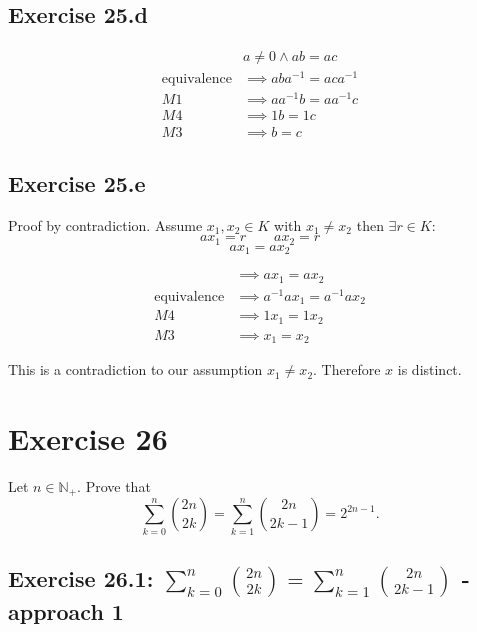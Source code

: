 \documentclass[a4paper]{article}
\theoremstyle{definition}
\begin{document}
\subsection{Exercise 25.d}

\begin{align*}
                     & a \neq 0 \land ab = ac \\
  \text{equivalence} &\implies aba^{-1} = aca^{-1} \\
                  M1 &\implies aa^{-1}b = aa^{-1}c \\
                  M4 &\implies 1b = 1c \\
                  M3 &\implies b = c
\end{align*}

\subsection{Exercise 25.e}

Proof by contradiction.
Assume $x_1, x_2 \in K$ with $x_1 \neq x_2$ then $\exists r \in K$:
\[ ax_1 = r \qquad ax_2 = r \]
\[ ax_1 = ax_2 \]

\begin{align*}
                     &\implies ax_1 = ax_2 \\
  \text{equivalence} &\implies a^{-1} ax_1 = a^{-1} ax_2 \\
                  M4 &\implies 1x_1 = 1x_2 \\
                  M3 &\implies x_1 = x_2
\end{align*}

This is a contradiction to our assumption $x_1 \neq x_2$.
Therefore $x$ is distinct.

\section{Exercise 26}
\begin{ex}
  Let $n \in \mathbb N_+$. Prove that
  \[ \sum_{k=0}^n \binom{2n}{2k} = \sum_{k=1}^n \binom{2n}{2k-1} = 2^{2n-1}. \]
\end{ex}

\subsection{Exercise 26.1: $\sum_{k=0}^n \binom{2n}{2k} = \sum_{k=1}^n \binom{2n}{2k-1}$ - approach 1}
\end{document}
